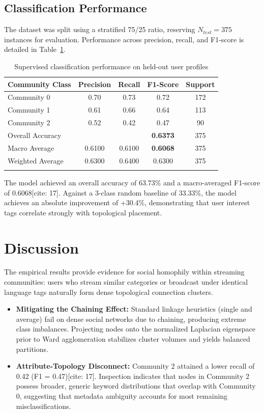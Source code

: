 \documentclass[sn-mathphys,Numbered]{sn-jnl}
\begin{document}
\subsection{Classification Performance}
The dataset was split using a stratified 75/25 ratio, reserving $N_{test} = 375$ instances for evaluation. Performance across precision, recall, and F1-score is detailed in Table~\ref{tab:classification}.

\begin{table}[ht]
\caption{Supervised classification performance on held-out user profiles}\label{tab:classification}
\begin{tabular*}{\columnwidth}{@{\extracolsep\fill}lcccc@{\extracolsep\fill}}
\toprule
Community Class & Precision & Recall & F1-Score & Support \\
\midrule
Community 0 & 0.70 & 0.73 & 0.72 & 172 \\
Community 1 & 0.61 & 0.66 & 0.64 & 113 \\
Community 2 & 0.52 & 0.42 & 0.47 & 90 \\
\midrule
Overall Accuracy & & & \textbf{0.6373} & 375 \\
Macro Average & 0.6100 & 0.6100 & \textbf{0.6068} & 375 \\
Weighted Average & 0.6300 & 0.6400 & 0.6300 & 375 \\
\botrule
\end{tabular*}
\end{table}

The model achieved an overall accuracy of 63.73\% and a macro-averaged F1-score of 0.6068[cite: 17]. Against a 3-class random baseline of 33.33\%, the model achieves an absolute improvement of +30.4\%, demonstrating that user interest tags correlate strongly with topological placement.

\section{Discussion}\label{sec4}
The empirical results provide evidence for social homophily within streaming communities: users who stream similar categories or broadcast under identical language tags naturally form dense topological connection clusters.

\begin{itemize}
    \item \textbf{Mitigating the Chaining Effect:} Standard linkage heuristics (single and average) fail on dense social networks due to chaining, producing extreme class imbalances. Projecting nodes onto the normalized Laplacian eigenspace prior to Ward agglomeration stabilizes cluster volumes and yields balanced partitions.
    \item \textbf{Attribute-Topology Disconnect:} Community 2 attained a lower recall of 0.42 (F1 = 0.47)[cite: 17]. Inspection indicates that nodes in Community 2 possess broader, generic keyword distributions that overlap with Community 0, suggesting that metadata ambiguity accounts for most remaining misclassifications.
\end{itemize}
\end{document}
